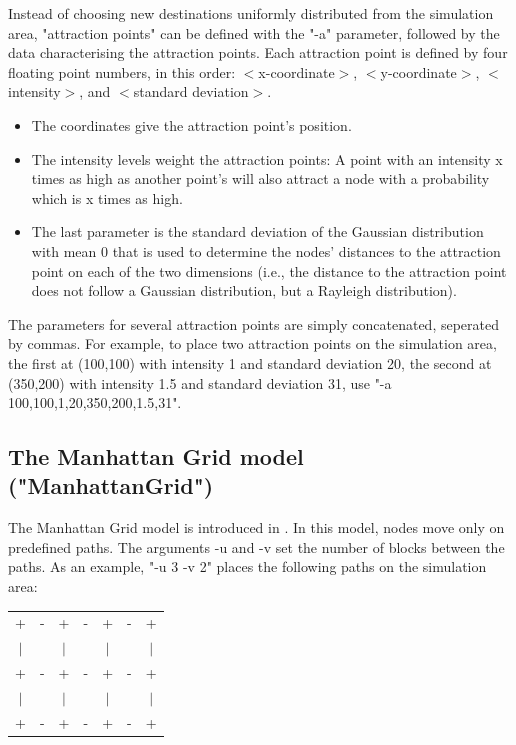 \documentclass[11pt,a4paper,twoside,normalheadings,headsepline,DIV13,BCOR11mm,openright]{article}
\begin{document}
Instead of choosing new  destinations  uniformly  distributed  from  the
simulation  area,  "attraction  points"  can  be  defined  with the "-a"
parameter, followed by the data characterising  the  attraction  points.
Each attraction point is defined by four floating point numbers, in this
order:  $<$x-coordinate$>$,  $<$y-coordinate$>$,  $<$intensity$>$,   and  
$<$standard deviation$>$.

\begin{itemize}
\item{The coordinates give the attraction point's position.}

\item{The  intensity  levels  weight the attraction points: A point with an
   intensity x times as high as another point's will also attract a node
   with a probability which is x times as high.}

\item{The  last  parameter  is  the  standard  deviation  of  the  Gaussian
   distribution with mean  0  that  is  used  to  determine  the  nodes'
   distances  to  the  attraction  point  on  each of the two dimensions
   (i.e., the distance  to  the  attraction  point  does  not  follow  a
   Gaussian distribution, but a Rayleigh distribution).}
\end{itemize}

The  parameters  for  several attraction points are simply concatenated,
seperated by commas. For example, to place two attraction points on  the
simulation  area,  the  first at (100,100) with intensity 1 and standard
deviation 20, the second at (350,200) with intensity  1.5  and  standard
deviation 31, use "-a 100,100,1,20,350,200,1.5,31".


\subsection{The Manhattan Grid model ("ManhattanGrid")}

The Manhattan Grid model is introduced in \cite{ETSI_Manhattan_Grid_1998}.
In this model, nodes move only on predefined paths. The arguments -u and
-v set the number of blocks between the paths. As an example, "-u  3  -v
2" places the following paths on the simulation area:

\begin{tabular}{ccccccc}
+ & - & + & - & + & - & +\\
$|$ & & $|$ & & $|$ & & $|$\\
+ & - & + & - & + & - & +\\
$|$ & & $|$ & & $|$ & & $|$\\
+ & - & + & - & + & - & +
\end{tabular}
   
\end{document}

